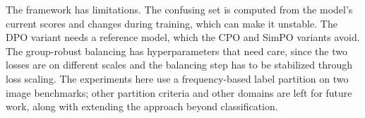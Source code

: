 The framework has limitations. The confusing set is computed from the model's
current scores and changes during training, which can make it unstable. The DPO
variant needs a reference model, which the CPO and SimPO variants avoid. The
group-robust balancing has hyperparameters that need care, since the two losses are
on different scales and the balancing step has to be stabilized through loss
scaling. The experiments here use a frequency-based label partition on two image
benchmarks; other partition criteria and other domains are left for future work,
along with extending the approach beyond classification.

